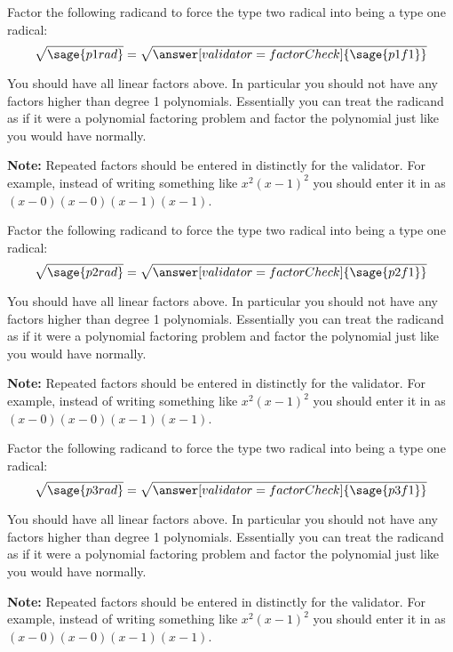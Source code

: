 \documentclass{ximera}
\begin{document}
\begin{problem}
    Factor the following radicand to force the type two radical into being a type one radical:
    \[
        \sqrt{\sage{p1rad}} = \sqrt{\answer[validator=factorCheck]{\sage{p1f1}}}
    \]
    \begin{feedback}
        You should have all linear factors above. In particular you should not have any factors higher than degree 1 polynomials. Essentially you can treat the radicand as if it were a polynomial factoring problem and factor the polynomial just like you would have normally.
        
        \textbf{Note:} Repeated factors should be entered in distinctly for the validator. For example, instead of writing something like $x^2(x-1)^2$ you should enter it in as $(x-0)(x-0)(x-1)(x-1)$.
    \end{feedback}
\end{problem}


\begin{problem}
    Factor the following radicand to force the type two radical into being a type one radical:
    \[
        \sqrt{\sage{p2rad}} = \sqrt{\answer[validator=factorCheck]{\sage{p2f1}}}
    \]
    \begin{feedback}
        You should have all linear factors above. In particular you should not have any factors higher than degree 1 polynomials. Essentially you can treat the radicand as if it were a polynomial factoring problem and factor the polynomial just like you would have normally.
        
        \textbf{Note:} Repeated factors should be entered in distinctly for the validator. For example, instead of writing something like $x^2(x-1)^2$ you should enter it in as $(x-0)(x-0)(x-1)(x-1)$.
    \end{feedback}
\end{problem}


\begin{problem}
    Factor the following radicand to force the type two radical into being a type one radical:
    \[
        \sqrt{\sage{p3rad}} = \sqrt{\answer[validator=factorCheck]{\sage{p3f1}}}
    \]
    \begin{feedback}
        You should have all linear factors above. In particular you should not have any factors higher than degree 1 polynomials. Essentially you can treat the radicand as if it were a polynomial factoring problem and factor the polynomial just like you would have normally.
        
        \textbf{Note:} Repeated factors should be entered in distinctly for the validator. For example, instead of writing something like $x^2(x-1)^2$ you should enter it in as $(x-0)(x-0)(x-1)(x-1)$.
    \end{feedback}
\end{problem}
\end{document}
